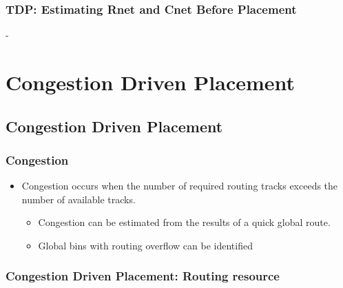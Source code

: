 \documentclass[compress]{beamer}
\begin{document}
\begin{frame}
	\frametitle{TDP: Estimating Rnet and Cnet Before Placement}
	\begin{center}
	\end{center}
\end{frame}

-
\section[Congestion]{Congestion Driven Placement}
\subsection[Congestion]{Congestion Driven Placement}
\begin{frame}
	\frametitle{Congestion}
	\begin{itemize}
		\item Congestion occurs when the number of required
		routing tracks exceeds the number of available tracks.
		\begin{itemize}
			\item Congestion can be estimated from
			the results of a quick global route.
			\item Global bins with routing overflow
			can be identified
		\end{itemize}
	\end{itemize}
\begin{center}
\end{center}
\end{frame}

\begin{frame}
	\frametitle{Congestion Driven Placement: Routing resource}
		\begin{center}
		\end{center}
\end{frame}
\end{document}
